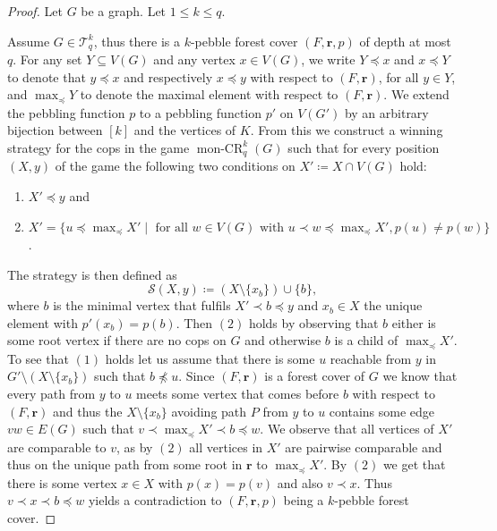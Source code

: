 \documentclass[a4paper,UKenglish,cleveref, autoref, thm-restate]{lipics-v2021}
\newcommand{\Ekq}{\ensuremath{\mathcal{T}_{q}^{k}}}
\DeclareMathOperator{\monCR}{mon-CR}
\renewcommand{\vec}[1]{\ensuremath{\boldsymbol{#1}}}
\begin{document}
\begin{proof}
	Let $G$ be a graph. Let $1\leq k\leq q$.
	
	Assume $G\in\Ekq$, thus there is a $k$-pebble forest cover $(F,\vec{r},p)$ of depth at most $q$.
	For any set $Y\subseteq V(G)$ and any vertex $x\in V(G)$, we write $Y\preceq x$ and $x\preceq Y$ to denote that $y\preceq x$ and respectively $x\preceq y$ with respect to $(F,\vec{r})$, for all $y\in Y$, and $\max_{\preceq}Y$ to denote the maximal element with respect to $(F,\vec{r})$.
	We extend the pebbling function $p$ to a pebbling function $p'$ on $V(G')$ by an arbitrary bijection between $[k]$ and the vertices of $K$.
	From this we construct a winning strategy for the cops in the game $\monCR_q^k(G)$ such that for every position $(X,y)$ of the game the following two conditions on $X'\coloneqq X\cap V(G)$ hold:
	\begin{enumerate}
		\item $X'\preceq y$ and
		\item $X'=\{u\preceq \max_{\preceq} X'\mid \text{ for all } w\in V(G) \text{ with }u\prec w\preceq \max_{\preceq} X', p(u)\neq p(w) \}$.
	\end{enumerate}
	The strategy is then defined as
	\begin{equation*}
	\mathcal{S}(X,y)\coloneqq \left(X\setminus \{x_b\}\right)\cup \{b\},
	\end{equation*}
	where $b$ is the minimal vertex that fulfils $X'\prec b\preceq y$ and $x_b\in X$ the unique element with $p'(x_b)=p(b)$.
	Then $(2)$ holds by observing that $b$ either is some root vertex if there are no cops on $G$ and otherwise $b$ is a child of $\max_{\preceq} X'$.
	To see that $(1)$ holds let us assume that there is some $u$ reachable from $y$ in $G'\setminus \left(X\setminus\{x_b\}\right)$ such that $b\not\preceq u$.
	Since $(F,\vec{r})$ is a forest cover of $G$ we know that every path from $y$ to $u$ meets some vertex that comes before $b$ with respect to $(F,\vec{r})$ and thus the $X\setminus\{x_b\}$ avoiding path $P$ from $y$ to $u$ contains some edge $vw\in E(G)$ such that $v\prec \max_{\preceq} X' \prec b \preceq w$.
	We observe that all vertices of $X'$ are comparable to $v$, as by $(2)$ all vertices in $X'$ are pairwise comparable and thus on the unique path from some root in $\vec{r}$ to $\max_{\preceq} X'$.
	By $(2)$ we get that there is some vertex $x\in X$ with $p(x)=p(v)$ and also $v\prec x$.
	Thus $v\prec x\prec b\preceq w$ yields a contradiction to $(F,\vec{r},p)$ being a $k$-pebble forest cover.
	

\end{proof}
\end{document}
